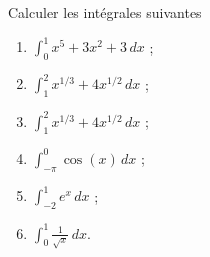 \begin{exercice}\label{exoTD5-00001}

Calculer les intégrales suivantes
\begin{enumerate}
\item $\displaystyle \int_0^1 x^5+3x^2+3 \, dx $ ;
  \item $\displaystyle \int_1^2 x^{1/3}+4x^{1/2} \, dx $ ;
    \item $\displaystyle \int_1^2 x^{1/3}+4x^{1/2} \, dx $ ;
      \item $\displaystyle \int_{-\pi}^{0} \cos(x) \, dx $ ;
        \item $\displaystyle \int_{-2}^{1} e^x \, dx$ ;
          \item $\displaystyle \int_{0}^{1} \frac{1}{\sqrt{x}} \, dx$.
\end{enumerate}
  
\end{exercice}
